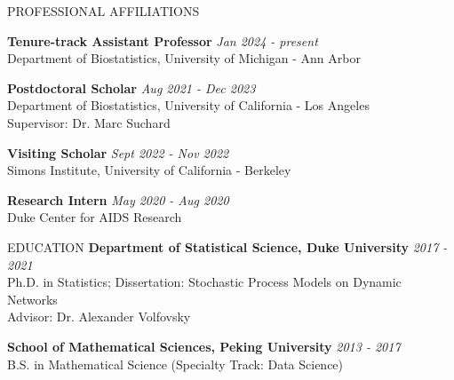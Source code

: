 \documentclass{resume} %
\begin{document}

\begin{rSection}{PROFESSIONAL AFFILIATIONS}
	
{\bf Tenure-track Assistant Professor} \hfill {\em Jan 2024  -  present} 
\\ {\small Department of Biostatistics, University of Michigan - Ann Arbor}
	
{\bf Postdoctoral Scholar} \hfill {\em Aug 2021 - Dec 2023} 
\\ {\small Department of Biostatistics, University of California - Los Angeles}
\\ {\small Supervisor: Dr. Marc Suchard}

{\bf Visiting Scholar} \hfill {\em Sept 2022 - Nov 2022} 
\\ {\small Simons Institute, University of California - Berkeley}


{\bf Research Intern} \hfill {\em May 2020 - Aug 2020} 
\\ { \small Duke Center for AIDS Research}
\end{rSection}

\begin{rSection}{EDUCATION}
{\bf Department of Statistical Science, Duke University} \hfill {\em 2017 - 2021} 
\\ Ph.D. in Statistics; Dissertation: Stochastic Process Models on Dynamic Networks
\\ {\small Advisor: Dr. Alexander Volfovsky}

{\bf School of Mathematical Sciences, Peking University} \hfill {\em 2013 - 2017} 
\\ B.S. in Mathematical Science (Specialty Track: Data Science)
\end{rSection}

%
%


\end{document}
